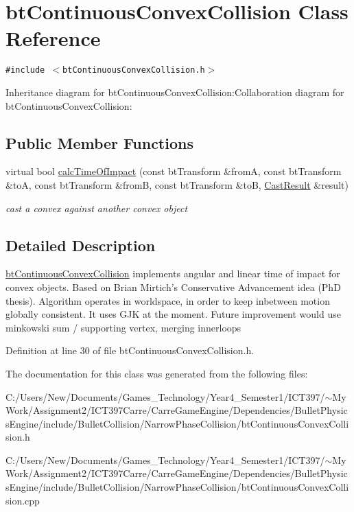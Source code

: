 \hypertarget{classbt_continuous_convex_collision}{
\section{btContinuousConvexCollision Class Reference}
\label{classbt_continuous_convex_collision}
}
{\tt \#include $<$btContinuousConvexCollision.h$>$}

Inheritance diagram for btContinuousConvexCollision:Collaboration diagram for btContinuousConvexCollision:\subsection*{Public Member Functions}
\begin{CompactItemize}
\item 
\hypertarget{classbt_continuous_convex_collision_fc75a57bddfeded52781bbd65ee16f37}{
virtual bool \hyperlink{classbt_continuous_convex_collision_fc75a57bddfeded52781bbd65ee16f37}{calcTimeOfImpact} (const btTransform \&fromA, const btTransform \&toA, const btTransform \&fromB, const btTransform \&toB, \hyperlink{structbt_convex_cast_1_1_cast_result}{CastResult} \&result)}
\label{classbt_continuous_convex_collision_fc75a57bddfeded52781bbd65ee16f37}

\begin{CompactList}\small\item\em cast a convex against another convex object \item\end{CompactList}\end{CompactItemize}


\subsection{Detailed Description}
\hyperlink{classbt_continuous_convex_collision}{btContinuousConvexCollision} implements angular and linear time of impact for convex objects. Based on Brian Mirtich's Conservative Advancement idea (PhD thesis). Algorithm operates in worldspace, in order to keep inbetween motion globally consistent. It uses GJK at the moment. Future improvement would use minkowski sum / supporting vertex, merging innerloops 

Definition at line 30 of file btContinuousConvexCollision.h.

The documentation for this class was generated from the following files:\begin{CompactItemize}
\item 
C:/Users/New/Documents/Games\_\-Technology/Year4\_\-Semester1/ICT397/$\sim$My Work/Assignment2/ICT397Carre/CarreGameEngine/Dependencies/BulletPhysicsEngine/include/BulletCollision/NarrowPhaseCollision/btContinuousConvexCollision.h\item 
C:/Users/New/Documents/Games\_\-Technology/Year4\_\-Semester1/ICT397/$\sim$My Work/Assignment2/ICT397Carre/CarreGameEngine/Dependencies/BulletPhysicsEngine/include/BulletCollision/NarrowPhaseCollision/btContinuousConvexCollision.cpp\end{CompactItemize}
